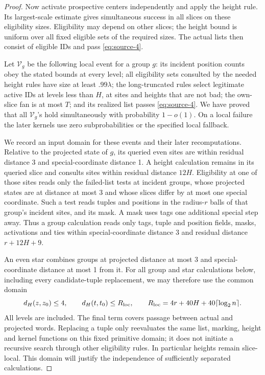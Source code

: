 \begin{proof}
Now activate prospective centers independently and apply the height rule. Its largest-scale estimate gives simultaneous success in all slices on these eligibility sizes. Eligibility may depend on other slices; the height bound is uniform over all fixed eligible sets of the required sizes. The actual lists then consist of eligible IDs and pass \eqref{eq:source-4}.

Let \(\mathcal V_g\) be the following local event for a group \(g\): its incident position counts obey the stated bounds at every level; all eligibility sets consulted by the needed height rules have size at least \(.99\lambda\); the long-truncated rules select legitimate active IDs at levels less than \(H\), at sites and heights that are not bad; the own-slice fan is at most \(T\); and its realized list passes \eqref{eq:source-4}. We have proved that all \(\mathcal V_g\)'s hold simultaneously with probability \(1-o(1)\). On a local failure the later kernels use zero subprobabilities or the specified local fallback.

We record an input domain for these events and their later recomputations. Relative to the projected state of \(g\), its queried even sites are within residual distance 3 and special-coordinate distance 1. A height calculation remains in its queried slice and consults sites within residual distance \(12H\). Eligibility at one of those sites reads only the failed-list tests at incident groups, whose projected states are at distance at most 3 and whose slices differ by at most one special coordinate. Such a test reads tuples and positions in the radius-\(r\) balls of that group's incident sites, and its mask. A mask uses tags one additional special step away. Thus a group calculation reads only tags, tuple and position fields, masks, activations and ties within special-coordinate distance 3 and residual distance \(r+12H+9\).

An even star combines groups at projected distance at most 3 and special-coordinate distance at most 1 from it. For all group and star calculations below, including every candidate-tuple replacement, we may therefore use the common domain
\[
 d_H(z,z_0)\le4,\qquad d_H(t,t_0)\le R_{\rm loc},\qquad
 R_{\rm loc}=4r+40H+40\lceil\log_2 n\rceil.
\]
All levels are included. The final term covers passage between actual and projected words. Replacing a tuple only reevaluates the same list, marking, height and kernel functions on this fixed primitive domain; it does not initiate a recursive search through other eligibility rules. In particular heights remain slice-local. This domain will justify the independence of sufficiently separated calculations.


\end{proof}
